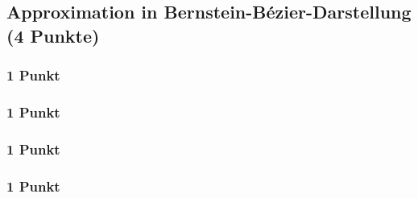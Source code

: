\newif\ifvimbug
\vimbugfalse

\ifvimbug

\fi


\subsection{Approximation in Bernstein-Bézier-Darstellung (4 Punkte)}
\subsubsection{1 Punkt}

\subsubsection{1 Punkt}

\subsubsection{1 Punkt}

\subsubsection{1 Punkt}
